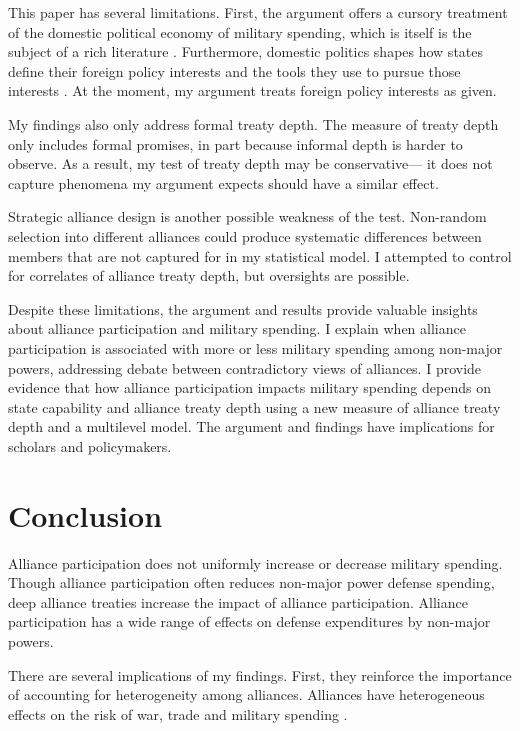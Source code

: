 \documentclass[12pt]{article}
\begin{document}
This paper has several limitations.
First, the argument offers a cursory treatment of the domestic political economy of military spending, which is itself is the subject of a rich literature \citep{WhittenWilliams2011, AlptekinLevine2012}.  
Furthermore, domestic politics shapes how states define their foreign policy interests and the tools they use to pursue those interests \citep{Fordham1998, Fordham2011, Narizny2007}. 
At the moment, my argument treats foreign policy interests as given.  


My findings also only address formal treaty depth. 
The measure of treaty depth only includes formal promises, in part because informal depth is harder to observe. 
As a result, my test of treaty depth may be conservative--- it does not capture phenomena my argument expects should have a similar effect. 


Strategic alliance design is another possible weakness of the test. 
Non-random selection into different alliances could produce systematic differences between members that are not captured for in my statistical model. 
I attempted to control for correlates of alliance treaty depth, but oversights are possible.


Despite these limitations, the argument and results provide valuable insights about alliance participation and military spending. 
I explain when alliance participation is associated with more or less military spending among non-major powers, addressing debate between contradictory views of alliances.  
I provide evidence that how alliance participation impacts military spending depends on state capability and alliance treaty depth using a new measure of alliance treaty depth and a multilevel model. 
The argument and findings have implications for scholars and policymakers. 


\section{Conclusion}

Alliance participation does not uniformly increase or decrease military spending. 
Though alliance participation often reduces non-major power defense spending, deep alliance treaties increase the impact of alliance participation. 
Alliance participation has a wide range of effects on defense expenditures by non-major powers. 


There are several implications of my findings.  
First, they reinforce the importance of accounting for heterogeneity among alliances.
Alliances have heterogeneous effects on the risk of war, trade and military spending \citep{Leeds2003, LongLeeds2006, Benson2012, DigiuseppePoast2016}. 
\end{document}
